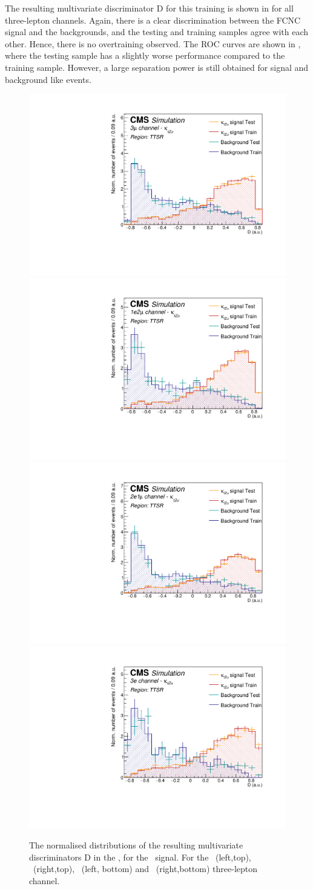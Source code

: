 \clearpage
The resulting multivariate discriminator D for this training is shown in  for all three-lepton channels. Again, there is a clear discrimination between the FCNC signal and the backgrounds, and the testing and training samples agree with each other. Hence, there is no overtraining observed. The ROC curves are shown in , where the testing sample has a slightly worse performance compared to the training sample. However, a large separation power is still obtained for signal and background like events. 
\begin{figure}[htbp]
	\centering
	\includegraphics[width=0.49\linewidth]{6_Search/Figures/PlotsTechnics/SigVsBkgTestZuttoppairuuu}
	\includegraphics[width=0.49\linewidth]{6_Search/Figures/PlotsTechnics/SigVsBkgTestZuttoppairuue}
	\includegraphics[width=0.49\linewidth]{6_Search/Figures/PlotsTechnics/SigVsBkgTestZuttoppaireeu}
	\includegraphics[width=0.49\linewidth]{6_Search/Figures/PlotsTechnics/SigVsBkgTestZuttoppaireee}
	\caption{The normalised distributions of the resulting  multivariate discriminators D in the \TTSR, for the \Zut\ signal. For the \mumumu\ (left,top), \emumu\ (right,top), \eemu\ (left, bottom) and \eee\ (right,bottom) three-lepton channel.}
	\label{fig:sigvsbkgtestzuttoppair}
\end{figure}


